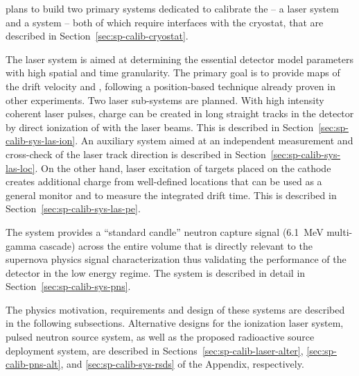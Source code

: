  plans to build two primary systems dedicated to %
calibrate the  -- a laser system
and a  system -- both of which require interfaces with the cryostat, that are described in Section~\ref{sec:sp-calib-cryostat}. 

The laser system is aimed at %
determining the essential detector model parameters with high spatial and time granularity. The primary goal is to provide maps of the drift velocity and \efield, following a position-based technique already proven in other  experiments. 
Two laser sub-systems are planned. 
With high intensity coherent laser pulses, charge can be created in long straight tracks in the detector by direct ionization of  with the laser beams. This is described in Section~\ref{sec:sp-calib-sys-las-ion}. An auxiliary system aimed at an independent measurement and cross-check of the laser track direction is described in Section~\ref{sec:sp-calib-sys-las-loc}.
On the other hand, laser excitation of targets placed on the cathode creates additional charge from well-defined locations that can be used %
as a general  monitor and to measure the integrated drift time. This is described in Section~\ref{sec:sp-calib-sys-las-pe}. 

The  system %
provides a ``standard candle'' neutron capture signal (\SI{6.1}{\MeV} multi-gamma cascade) across the entire  volume that is directly relevant to the supernova physics signal characterization thus validating the performance of the detector in the low energy regime. The  system is described in detail in Section~\ref{sec:sp-calib-sys-pns}.  

The physics motivation, requirements and design of these systems are described in the following subsections. Alternative designs
for the ionization laser system, pulsed neutron source system, as well as the proposed radioactive source deployment system, are described in Sections~\ref{sec:sp-calib-laser-alter}, \ref{sec:sp-calib-pns-alt}, and \ref{sec:sp-calib-sys-rsds} of the Appendix, respectively.